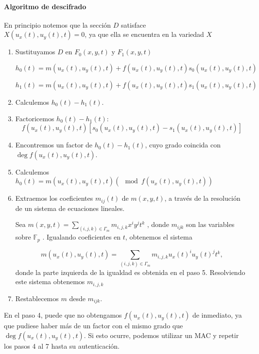 \documentclass[12pt]{article}
\begin{document}
\paragraph*{Algoritmo de descifrado}
En principio notemos que la secci\'on $D$ satisface  \\$X(u_x (t), u_y (t), t) = 0$, ya que ella se encuentra en la variedad $X$

\begin{enumerate}
\item  Sustituyamos  $D$ en $F_0 (x, y, t)$ y $F_1 (x, y, t)$
 
 $h_0 (t)= m(u_x (t), u_y (t), t) + f (u_x (t), u_y (t), t)s_0 (u_x (t), u_y (t), t)$
 
 $h_1 (t) = m(u_x (t), u_y (t), t) + f (u_x (t), u_y (t), t)s_1 (u_x (t), u_y (t), t)$
 
 \item Calculemos  $h_0 (t) - h_1 (t)$.
 
 
\item  Factoricemos $h_0 (t) - h_1 (t)$:
$$f (u_x (t), u_y (t), t)[s_0 (u_x (t), u_y (t), t) - s_1 (u_x (t), u_y (t), t)]$$

\item Encontremos  un factor de  $h_0 (t) -h_1 (t)$, cuyo grado coincida con \\$\deg f (u_x (t), u_y (t), t)$.


\item Calculemos $h_0 (t)  = m(u_x (t), u_y (t), t)(\mod f(u_x (t), u_y (t), t))$

\item Extraemos los coeficientes $m_{ij} (t)$ de $m(x, y, t)$, a trav\'es de la resoluci\'on de un sistema de ecuaciones lineales.

Sea $m(x, y, t) =\sum_{(i,j,k)\in\Gamma_m}m_{i,j,k} x^i y^j t^k$ , donde $m_{ijk}$ son las variables  sobre $\mathbb{F}_p$ . Igualando coeficientes en $t$, obtenemos el sistema

$$m(u_x (t), u_y (t), t) =\sum_{(i,j,k)\in\Gamma_m}m_{i,j,k} u_x(t)^i u_y(t)^j t^k, $$
donde la parte izquierda de la igualdad es obtenida en el paso 5. Resolviendo este sistema obtenemos $m_{i,j,k}$

\item Restablecemos $m$ desde $m_{ijk}$.
\end{enumerate}

En el paso 4, puede que no obtengamos  $f(u_x(t),u_y(t),t)$ de inmediato, ya que pudiese haber m\'as de un factor con el mismo grado que $\deg f(u_x(t),u_y(t),t)$. Si esto ocurre, podemos utilizar un MAC y repetir los pasos 4 al 7 hasta su autenticaci\'on.
\end{document}
